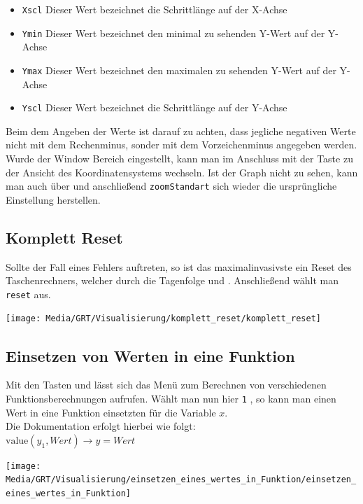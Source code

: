 \begin{itemize}
	\item[] \texttt{Xscl} Dieser Wert bezeichnet die Schrittlänge auf der X-Achse 
	\item[] \texttt{Ymin} Dieser Wert bezeichnet den minimal zu sehenden Y-Wert auf der Y-Achse
	\item[] \texttt{Ymax} Dieser Wert bezeichnet den maximalen zu sehenden Y-Wert auf der Y-Achse
	\item[] \texttt{Yscl} Dieser Wert bezeichnet die Schrittlänge auf der Y-Achse
\end{itemize} Beim dem Angeben der Werte ist darauf zu achten, dass jegliche negativen Werte nicht mit dem Rechenminus, sonder mit dem Vorzeichenminus angegeben werden. Wurde der Window Bereich eingestellt, kann man im Anschluss mit der Taste  zu der Ansicht des Koordinatensystems wechseln.
Ist der Graph nicht zu sehen, kann man auch über  und anschließend \texttt{zoomStandart} sich wieder die ursprüngliche Einstellung herstellen. 

\subsection{Komplett Reset}\label{sec:Komplett Reset}
\begin{paracol}{2}
\begin{flushleft}
	Sollte der Fall eines Fehlers auftreten, so ist das maximalinvasivste ein Reset des Taschenrechners, welcher durch die Tagenfolge  und \gtr{+}. Anschließend wählt man \texttt{reset} aus.
\end{flushleft}
\switchcolumn
\begin{flushright}
	\texttt{[image: Media/GRT/Visualisierung/komplett\_reset/komplett\_reset]}
\end{flushright}	
\end{paracol}

\subsection{Einsetzen von Werten in eine Funktion}\label{sec:Einsetzen von Werten in eine Funktion}
\begin{paracol}{2}
\begin{flushleft}
	Mit den Tasten  und  lässt sich das Menü zum Berechnen von verschiedenen Funktionsberechnungen aufrufen. Wählt man nun hier \texttt{1} , so kann man einen Wert in eine Funktion einsetzten für die Variable $x$.\\
	Die Dokumentation erfolgt hierbei wie folgt: \\
	$\mathrm{value}(y_1,\mathit{Wert}) \rightarrow y=\mathit{Wert}$
	
\end{flushleft}
\switchcolumn
\begin{flushright}
	\texttt{[image: Media/GRT/Visualisierung/einsetzen\_eines\_wertes\_in\_Funktion/einsetzen\_eines\_wertes\_in\_Funktion]}
\end{flushright}
\end{paracol}
\pagebreak
